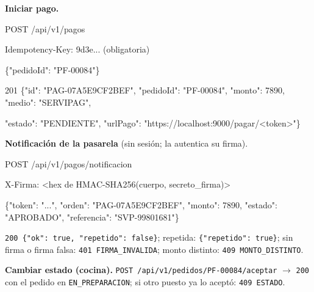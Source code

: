 \textbf{Iniciar pago.}


\begin{codigo}
POST /\allowbreak{}api/\allowbreak{}v1/\allowbreak{}pagos\par
Idempotency-\allowbreak{}Key:\allowbreak{} 9d3e.\allowbreak{}.\allowbreak{}.\allowbreak{}            (\allowbreak{}obligatoria)\par
\{"pedidoId":\allowbreak{} "PF-\allowbreak{}00084"\}\par
\end{codigo}

\begin{codigo}
201 \{"id":\allowbreak{} "PAG-\allowbreak{}07A5E9CF2BEF",\allowbreak{} "pedidoId":\allowbreak{} "PF-\allowbreak{}00084",\allowbreak{} "monto":\allowbreak{} 7890,\allowbreak{} "medio":\allowbreak{} "SERVIPAG",\allowbreak{}\par
\hspace*{5\ttw}"estado":\allowbreak{} "PENDIENTE",\allowbreak{} "urlPago":\allowbreak{} "https:\allowbreak{}/\allowbreak{}/\allowbreak{}localhost:\allowbreak{}9000/\allowbreak{}pagar/\allowbreak{}<token>"\}\par
\end{codigo}

\textbf{Notificación de la pasarela} (sin sesión; la autentica su firma).


\begin{codigo}
POST /\allowbreak{}api/\allowbreak{}v1/\allowbreak{}pagos/\allowbreak{}notificacion\par
X-\allowbreak{}Firma:\allowbreak{} <hex de HMAC-\allowbreak{}SHA256(\allowbreak{}cuerpo,\allowbreak{} secreto\_\allowbreak{}firma)>\par
\{"token":\allowbreak{} ".\allowbreak{}.\allowbreak{}.\allowbreak{}",\allowbreak{} "orden":\allowbreak{} "PAG-\allowbreak{}07A5E9CF2BEF",\allowbreak{} "monto":\allowbreak{} 7890,\allowbreak{} "estado":\allowbreak{} "APROBADO",\allowbreak{} "referencia":\allowbreak{} "SVP-\allowbreak{}99801681"\}\par
\end{codigo}

\texttt{200 \{"ok":\allowbreak{} true,\allowbreak{} "repetido":\allowbreak{} false\}}; repetida: \texttt{\{"repetido":\allowbreak{} true\}}; sin firma o firma falsa: \texttt{401 FIRMA\_\allowbreak{}INVALIDA}; monto distinto: \texttt{409 MONTO\_\allowbreak{}DISTINTO}.


\textbf{Cambiar estado (cocina).} \texttt{POST /\allowbreak{}api/\allowbreak{}v1/\allowbreak{}pedidos/\allowbreak{}PF-\allowbreak{}00084/\allowbreak{}aceptar} $\rightarrow$ \texttt{200} con el pedido en \texttt{EN\_\allowbreak{}PREPARACION}; si otro puesto ya lo aceptó: \texttt{409 ESTADO}.


